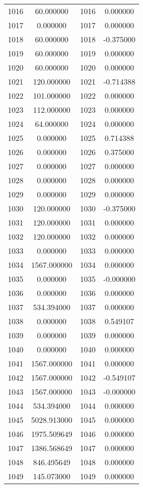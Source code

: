 \documentclass[12pt]{article}
\begin{document}
\begin{longtable}{@{}cccc@{}}
1016 & 60.000000 & 1016 & 0.000000 \\
1017 & 0.000000 & 1017 & 0.000000 \\
1018 & 60.000000 & 1018 & -0.375000 \\
1019 & 60.000000 & 1019 & 0.000000 \\
1020 & 60.000000 & 1020 & 0.000000 \\
1021 & 120.000000 & 1021 & -0.714388 \\
1022 & 101.000000 & 1022 & 0.000000 \\
1023 & 112.000000 & 1023 & 0.000000 \\
1024 & 64.000000 & 1024 & 0.000000 \\
1025 & 0.000000 & 1025 & 0.714388 \\
1026 & 0.000000 & 1026 & 0.375000 \\
1027 & 0.000000 & 1027 & 0.000000 \\
1028 & 0.000000 & 1028 & 0.000000 \\
1029 & 0.000000 & 1029 & 0.000000 \\
1030 & 120.000000 & 1030 & -0.375000 \\
1031 & 120.000000 & 1031 & 0.000000 \\
1032 & 120.000000 & 1032 & 0.000000 \\
1033 & 0.000000 & 1033 & 0.000000 \\
1034 & 1567.000000 & 1034 & 0.000000 \\
1035 & 0.000000 & 1035 & -0.000000 \\
1036 & 0.000000 & 1036 & 0.000000 \\
1037 & 534.394000 & 1037 & 0.000000 \\
1038 & 0.000000 & 1038 & 0.549107 \\
1039 & 0.000000 & 1039 & 0.000000 \\
1040 & 0.000000 & 1040 & 0.000000 \\
1041 & 1567.000000 & 1041 & 0.000000 \\
1042 & 1567.000000 & 1042 & -0.549107 \\
1043 & 1567.000000 & 1043 & -0.000000 \\
1044 & 534.394000 & 1044 & 0.000000 \\
1045 & 5028.913000 & 1045 & 0.000000 \\
1046 & 1975.509649 & 1046 & 0.000000 \\
1047 & 1386.568649 & 1047 & 0.000000 \\
1048 & 846.495649 & 1048 & 0.000000 \\
1049 & 145.073000 & 1049 & 0.000000 \\

\end{longtable}
\end{document}
